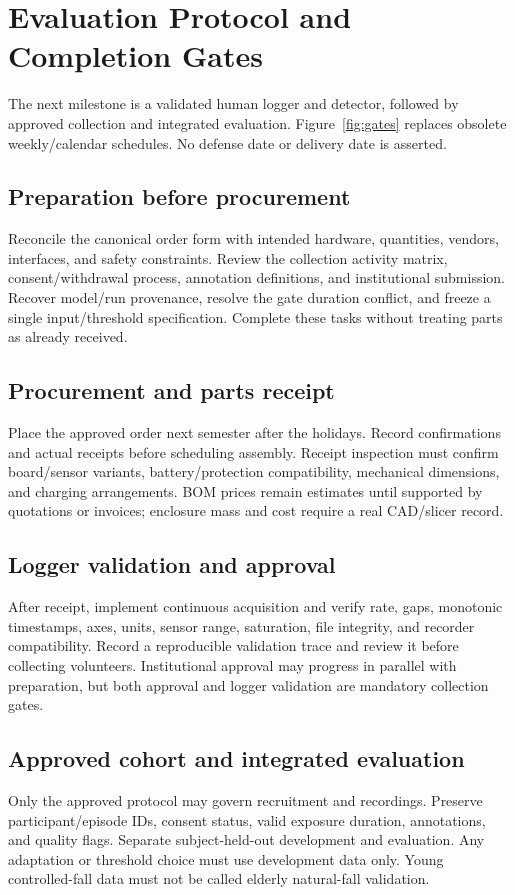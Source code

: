 \chapter{Evaluation Protocol and Completion Gates}
\label{ch:remaining}
The next milestone is a validated human logger and detector, followed by approved collection and integrated evaluation. Figure~\ref{fig:gates} replaces obsolete weekly/calendar schedules. No defense date or delivery date is asserted.


\section{Preparation before procurement}
Reconcile the canonical order form with intended hardware, quantities, vendors, interfaces, and safety constraints. Review the collection activity matrix, consent/withdrawal process, annotation definitions, and institutional submission. Recover model/run provenance, resolve the gate duration conflict, and freeze a single input/threshold specification. Complete these tasks without treating parts as already received.

\section{Procurement and parts receipt}
Place the approved order next semester after the holidays. Record confirmations and actual receipts before scheduling assembly. Receipt inspection must confirm board/sensor variants, battery/protection compatibility, mechanical dimensions, and charging arrangements. BOM prices remain estimates until supported by quotations or invoices; enclosure mass and cost require a real CAD/slicer record.

\section{Logger validation and approval}
After receipt, implement continuous acquisition and verify rate, gaps, monotonic timestamps, axes, units, sensor range, saturation, file integrity, and recorder compatibility. Record a reproducible validation trace and review it before collecting volunteers. Institutional approval may progress in parallel with preparation, but both approval and logger validation are mandatory collection gates.

\section{Approved cohort and integrated evaluation}
Only the approved protocol may govern recruitment and recordings. Preserve participant/episode IDs, consent status, valid exposure duration, annotations, and quality flags. Separate subject-held-out development and evaluation. Any adaptation or threshold choice must use development data only. Young controlled-fall data must not be called elderly natural-fall validation.

